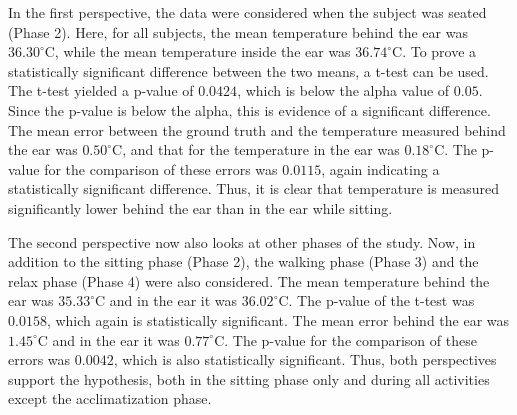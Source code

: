 In the first perspective, the data were considered when the subject was seated (Phase 2). 
Here, for all subjects, the mean temperature behind the ear was \(36.30^\circ\text{C}\), while the mean temperature inside the ear was \(36.74^\circ\text{C}\). 
To prove a statistically significant difference between the two means, a t-test can be used.
The t-test yielded a p-value of \(0.0424\), which is below the alpha value of \(0.05\).
Since the p-value is below the alpha, this is evidence of a significant difference.
The mean error between the ground truth and the temperature measured behind the ear was \(0.50^\circ\text{C}\), and that for the temperature in the ear was \(0.18^\circ\text{C}\). 
The p-value for the comparison of these errors was \(0.0115\), again indicating a statistically significant difference.
Thus, it is clear that temperature is measured significantly lower behind the ear than in the ear while sitting.

The second perspective now also looks at other phases of the study. 
Now, in addition to the sitting phase (Phase 2), the walking phase (Phase 3) and the relax phase (Phase 4) were also considered. 
The mean temperature behind the ear was \(35.33^\circ\text{C}\) and in the ear it was \(36.02^\circ\text{C}\). 
The p-value of the t-test was \(0.0158\), which again is statistically significant.
The mean error behind the ear was \(1.45^\circ\text{C}\) and in the ear it was \(0.77^\circ\text{C}\). 
The p-value for the comparison of these errors was \(0.0042\), which is also statistically significant.
Thus, both perspectives support the hypothesis, both in the sitting phase only and during all activities except the acclimatization phase.

